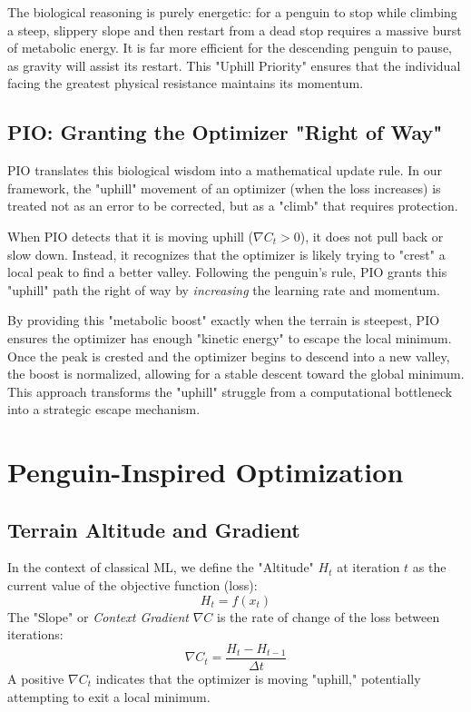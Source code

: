 \documentclass[conference]{IEEEtran}
\begin{document}
The biological reasoning is purely energetic: for a penguin to stop while climbing a steep, slippery slope and then restart from a dead stop requires a massive burst of metabolic energy. It is far more efficient for the descending penguin to pause, as gravity will assist its restart. This "Uphill Priority" ensures that the individual facing the greatest physical resistance maintains its momentum.

\subsection{PIO: Granting the Optimizer "Right of Way"}
PIO translates this biological wisdom into a mathematical update rule. In our framework, the "uphill" movement of an optimizer (when the loss increases) is treated not as an error to be corrected, but as a "climb" that requires protection.

When PIO detects that it is moving uphill ($\nabla C_t > 0$), it does not pull back or slow down. Instead, it recognizes that the optimizer is likely trying to "crest" a local peak to find a better valley. Following the penguin's rule, PIO grants this "uphill" path the right of way by \textit{increasing} the learning rate and momentum.

By providing this "metabolic boost" exactly when the terrain is steepest, PIO ensures the optimizer has enough "kinetic energy" to escape the local minimum. Once the peak is crested and the optimizer begins to descend into a new valley, the boost is normalized, allowing for a stable descent toward the global minimum. This approach transforms the "uphill" struggle from a computational bottleneck into a strategic escape mechanism.

\section{Penguin-Inspired Optimization}
\subsection{Terrain Altitude and Gradient}
In the context of classical ML, we define the "Altitude" $H_t$ at iteration $t$ as the current value of the objective function (loss):
\begin{equation}
H_t = f(x_t)
\end{equation}
The "Slope" or \textit{Context Gradient} $\nabla C$ is the rate of change of the loss between iterations:
\begin{equation}
\nabla C_t = \frac{H_t - H_{t-1}}{\Delta t}
\end{equation}
A positive $\nabla C_t$ indicates that the optimizer is moving "uphill," potentially attempting to exit a local minimum.
\end{document}
